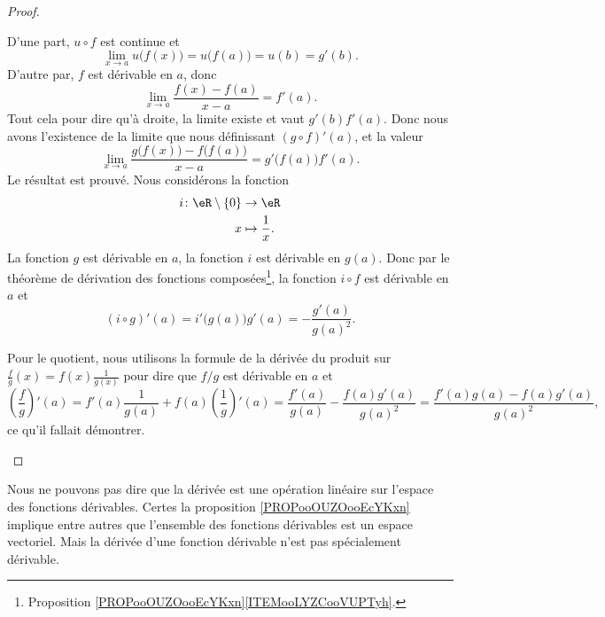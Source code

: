 \begin{proof}
\begin{subproof}
		D'une part, \( u\circ f\) est continue et
		\begin{equation}
			\lim_{x\to a} u\big( f(x) \big)=u\big( f(a) \big)=u(b)=g'(b).
		\end{equation}
		D'autre par, \( f\) est dérivable en \( a\), donc
		\begin{equation}
			\lim_{x\to a} \frac{ f(x)-f(a) }{ x-a }=f'(a).
		\end{equation}
		Tout cela pour dire qu'à droite, la limite existe et vaut \( g'(b)f'(a)\). Donc nous avons l'existence de la limite que nous définissant \( (g\circ f)'(a)\), et la valeur
		\begin{equation}
			\lim_{x\to a} \frac{ g\big( f(x) \big)-f\big( f(a) \big) }{ x-a }= g'\big( f(a) \big)f'(a).
		\end{equation}
		Le résultat est prouvé.
		Nous considérons la fonction
		\begin{equation}
			\begin{aligned}
				i\colon \eR\setminus\{ 0 \} & \to \eR                \\
				x                           & \mapsto \frac{1}{ x }.
			\end{aligned}
		\end{equation}
		La fonction \( g\) est dérivable en \( a\), la fonction \( i\) est dérivable en \( g(a)\). Donc par le théorème de dérivation des fonctions composées\footnote{Proposition \ref{PROPooOUZOooEcYKxn}\ref{ITEMooLYZCooVUPTyh}.}, la fonction \( i\circ f\) est dérivable en \( a\) et
		\begin{equation}
			(i\circ g)'(a)=i'\big( g(a) \big)g'(a)=-\frac{ g'(a) }{ g(a)^2 }.
		\end{equation}

		Pour le quotient, nous utilisons la formule de la dérivée du produit sur \( \frac{ f }{ g }(x)=f(x)\frac{1}{ g(x) } \) pour dire que \( f/g\) est dérivable en \( a\) et
		\begin{equation}
			\left( \frac{ f }{ g } \right)'(a)=f'(a)\frac{1}{ g(a) }+f(a)\left( \frac{1}{ g } \right)'(a)
			=\frac{ f'(a) }{ g(a) }-\frac{ f(a)g'(a) }{ g(a)^2 }
			=\frac{ f'(a)g(a)-f(a)g'(a) }{ g(a)^2 },
		\end{equation}
		ce qu'il fallait démontrer.
	\end{subproof}
\end{proof}

\begin{remark}
	Nous ne pouvons pas dire que la dérivée est une opération linéaire sur l'espace des fonctions dérivables. Certes la proposition \ref{PROPooOUZOooEcYKxn} implique entre autres que l'ensemble des fonctions dérivables est un espace vectoriel. Mais la dérivée d'une fonction dérivable n'est pas spécialement dérivable.
\end{remark}

